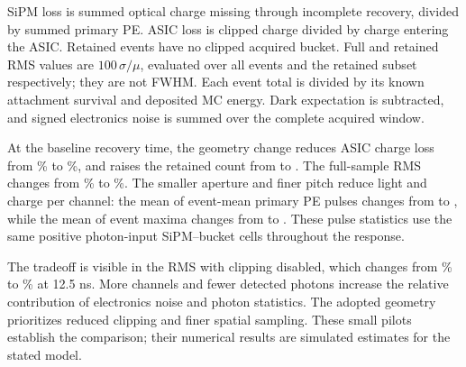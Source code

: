 \documentclass[11pt,a4paper]{article}
\newcommand{\num}[2][3]{\pgfmathprintnumber[fixed,precision=#1,fixed zerofill]{#2}}
\begin{document}
\begin{center}\small

\end{center}
SiPM loss is summed optical charge missing through incomplete recovery,
divided by summed primary PE. ASIC loss is clipped charge divided by charge
entering the ASIC. Retained events have no clipped acquired bucket. Full and
retained RMS values are $100\,\sigma/\mu$, evaluated over all events and the
retained subset respectively; they are not FWHM. Each event total is divided
by its known attachment survival and deposited MC energy. Dark expectation
is subtracted, and signed electronics noise is summed over the complete
acquired window.

At the baseline recovery time, the geometry change reduces ASIC charge loss
from \num[4]{\elmPilotFiveASICLoss}\% to \num[4]{\elmPilotFourASICLoss}\%, and
raises the retained count from \num[0]{\elmPilotFiveRetained} to
\num[0]{\elmPilotFourRetained}. The full-sample RMS changes from
\num[4]{\elmPilotFiveFullRMS}\% to \num[4]{\elmPilotFourFullRMS}\%.
The smaller aperture and finer pitch reduce light and charge per channel:
the mean of event-mean primary PE pulses changes from
\num[2]{\elmPilotFiveMeanPE} to \num[2]{\elmPilotFourMeanPE}, while the mean of
event maxima changes from \num[2]{\elmPilotFiveMaxPE} to
\num[2]{\elmPilotFourMaxPE}. These pulse statistics use the same positive
photon-input SiPM--bucket cells throughout the response.

The tradeoff is visible in the RMS with clipping disabled, which changes
from \num[4]{\elmPilotFiveUnclippedRMS}\% to
\num[4]{\elmPilotFourUnclippedRMS}\% at 12.5 ns. More channels and fewer
detected photons increase the relative contribution of electronics noise
and photon statistics. The adopted geometry prioritizes reduced clipping
and finer spatial sampling. These small pilots establish the comparison;
their numerical results are simulated estimates for the stated model.
\end{document}
